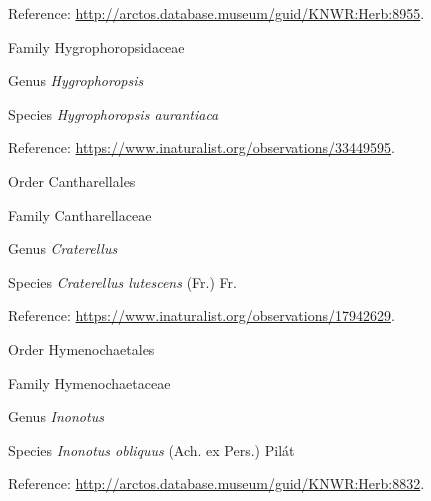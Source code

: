 \documentclass[9pt, article]{memoir}
\begin{document}
\begin{multicols}{2}
\vspace{6pt}Reference: 
\url{http://arctos.database.museum/guid/KNWR:Herb:8955}.

\vspace{6pt}\noindent\hspace{24pt}Family Hygrophoropsidaceae


\vspace{6pt}\noindent\hspace{30pt}Genus \textit{Hygrophoropsis}


\vspace{6pt}\noindent\hspace{36pt}Species \textit{Hygrophoropsis aurantiaca}


\vspace{6pt}Reference: 
\url{https://www.inaturalist.org/observations/33449595}.

\vspace{6pt}\noindent\hspace{18pt}Order Cantharellales


\vspace{6pt}\noindent\hspace{24pt}Family Cantharellaceae


\vspace{6pt}\noindent\hspace{30pt}Genus \textit{Craterellus}


\vspace{6pt}\noindent\hspace{36pt}Species \textit{Craterellus lutescens} (Fr.) Fr.


\vspace{6pt}Reference: 
\url{https://www.inaturalist.org/observations/17942629}.

\vspace{6pt}\noindent\hspace{18pt}Order Hymenochaetales


\vspace{6pt}\noindent\hspace{24pt}Family Hymenochaetaceae


\vspace{6pt}\noindent\hspace{30pt}Genus \textit{Inonotus}


\vspace{6pt}\noindent\hspace{36pt}Species \textit{Inonotus obliquus} (Ach. ex Pers.) Pilát


\vspace{6pt}Reference: 
\url{http://arctos.database.museum/guid/KNWR:Herb:8832}.


\end{multicols}
\end{document}
